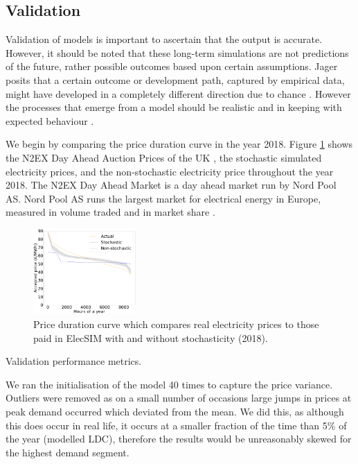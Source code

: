 \subsection{Validation}


 Validation of models is important to ascertain that the output is accurate. However, it should be noted that these long-term simulations are not predictions of the future, rather possible outcomes based upon certain assumptions. Jager posits that a certain outcome or development path, captured by empirical data, might have developed in a completely different direction due to chance \cite{Jager2006a}. However the processes that emerge from a model should be realistic and in keeping with expected behaviour \cite{Jager2006}.

We begin by comparing the price duration curve in the year 2018. Figure \ref{fig:price_duration_curve} shows the N2EX Day Ahead Auction Prices of the UK \cite{nordpool_2019}, the stochastic simulated electricity prices, and the non-stochastic electricity price throughout the year 2018. The N2EX Day Ahead Market is a day ahead market run by Nord Pool AS. Nord Pool AS runs the largest market for electrical energy in Europe, measured in volume traded and in market share \cite{nordpool_2019}.


\begin{figure}
	\begin{center}
		\includegraphics[width=0.35\textwidth]{figures/load_price_duration_curve_comparison.pdf}
		\caption{Price duration curve which compares real electricity prices to those paid in ElecSIM with and without stochasticity (2018).}
		\label{fig:price_duration_curve}
	\end{center}
\end{figure}
\begin{table}
	\centering
	\caption{Validation performance metrics.}
	\label{table:validation_metrics}
\end{table}

We ran the initialisation of the model 40 times to capture the price variance. Outliers were removed as on a small number of occasions large jumps in prices at peak demand occurred which deviated from the mean. We did this, as although this does occur in real life, it occurs at a smaller fraction of the time than 5\% of the year (modelled LDC), therefore the results would be unreasonably skewed for the highest demand segment. 

